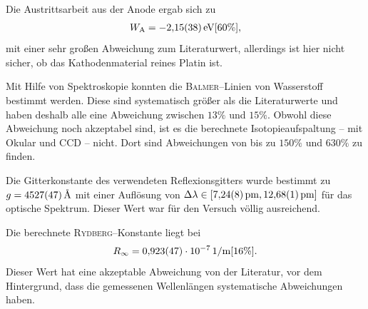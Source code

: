 \documentclass[sn-mathphys-num,iicol]{sn-jnl}
\theoremstyle{thmstyleone}
\theoremstyle{thmstyletwo}
\theoremstyle{thmstylethree}
\begin{document}
Die Austrittsarbeit aus der Anode ergab sich zu
\begin{align} 
        W_\text{A}=\SI{-2.15+-0.38}{eV}[60\%]
,\end{align} 
mit einer sehr großen Abweichung zum Literaturwert, allerdings ist hier nicht sicher, ob das Kathodenmaterial reines Platin ist.

Mit Hilfe von Spektroskopie konnten die \textsc{Balmer}--Linien von Wasserstoff bestimmt werden.
Diese sind systematisch größer als die Literaturwerte und haben deshalb alle eine Abweichung zwischen $13\%$ und $15\%$.
Obwohl diese Abweichung noch akzeptabel sind, ist es die berechnete Isotopieaufspaltung -- mit Okular und CCD -- nicht.
Dort sind Abweichungen von bis zu $150\%$ und $630\%$ zu finden.

Die Gitterkonstante des verwendeten Reflexionsgitters wurde bestimmt zu $g=\SI{4527+-47}{\text{\r{A}}}$ mit einer Auflösung von $\Delta \lambda  \in \left[\SI{7.24+-0.08}{pm},\SI{12.68+-0.01}{pm}\right]$ für das optische Spektrum.
Dieser Wert war für den Versuch völlig ausreichend.

Die berechnete \textsc{Rydberg}--Konstante liegt bei
\begin{align} 
        R_\infty=\SI{0.923+-0.047e-7}{1/m}[16\%]
.\end{align} 
Dieser Wert hat eine akzeptable Abweichung von der Literatur, vor dem Hintergrund, dass die gemessenen Wellenlängen systematische Abweichungen haben.

\clearpage
\end{document}
